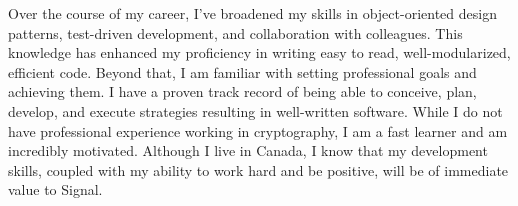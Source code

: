 Over the course of my career, I’ve broadened my skills in object-oriented design patterns, test-driven development, and collaboration with colleagues. 
This knowledge has enhanced my proficiency in writing easy to read, well-modularized, efficient code.
Beyond that, I am familiar with setting professional goals and achieving them. 
I have a proven track record of being able to conceive, plan, develop, and execute strategies resulting in well-written software. 
While I do not have professional experience working in cryptography, I am a fast learner and am incredibly motivated.
Although I live in Canada, I know that my development skills, coupled with my ability to work hard and be positive, will be of immediate value to Signal.